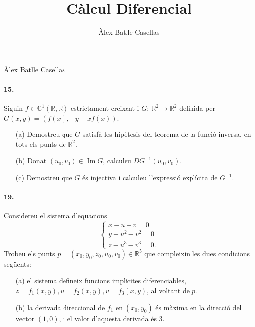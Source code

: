 \documentclass[10pt]{article}
\title{Càlcul Diferencial}
\author{Àlex Batlle Casellas}
\newcommand{\rn}[1]{\mathbb{R}^{#1}}
\DeclareMathOperator{\img}{Im}
\begin{document}
\begin{small}
Àlex Batlle Casellas
\end{small}
\paragraph{15.} Siguin $f\in\mathbb{C}^1(\mathbb{R},\mathbb{R})$ estrictament creixent i $G:\ \rn{2}\rightarrow\rn{2}$ definida per $G(x,y)=(f(x),-y+xf(x))$.
\begin{itemize}
\item[(a)] Demostreu que $G$ satisfà les hipòtesis del teorema de la funció inversa, en tots els punts de $\rn{2}$.
\item[(b)] Donat $(u_0,v_0)\in\img{G}$, calculeu $DG^{-1}(u_0,v_0)$.
\item[(c)] Demostreu que $G$ és injectiva i calculeu l'expressió explícita de $G^{-1}$.
\end{itemize}
\paragraph{19.} Considereu el sistema d'equacions
\[
\begin{cases}
x-u-v=0\\
y-u^2-v^2=0\\
z-u^3-v^3=0.
\end{cases}
\]
Trobeu els punts $p=(x_0,y_0,z_0,u_0,v_0)\in\rn{5}$ que compleixin les dues condicions següents:
\begin{itemize}
\item[(a)] el sistema defineix funcions implícites diferenciables, $z=f_1(x,y),u=f_2(x,y),v=f_3(x,y)$, al voltant de $p$.
\item[(b)] la derivada direccional de $f_1$ en $(x_0,y_0)$ és màxima en la direcció del vector $(1,0)$, i el valor d'aquesta derivada és 3.
\end{itemize}
\end{document}
